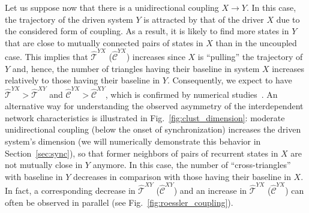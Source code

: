 		Let us suppose now that there is a unidirectional coupling $X\to Y$. In this case, the trajectory of the driven system $Y$ is attracted by that of the driver $X$ due to the considered form of coupling. As a result, it is likely to find more states in $Y$ that are close to mutually connected pairs of states in $X$ than in the uncoupled case. This implies that $\hat{\mathcal{T}}^{YX}$ ($\hat{\mathcal{C}}^{YX}$) increases since $X$ is ``pulling'' the trajectory of $Y$ and, hence, the number of triangles having their baseline in system $X$ increases relatively to those having their baseline in $Y$. Consequently, we expect to have $\hat{\mathcal{T}}^{YX}>\hat{\mathcal{T}}^{XY}$ and $\hat{\mathcal{C}}^{YX}>\hat{\mathcal{C}}^{XY}$, which is confirmed by numerical studies~\cite{Feldhoff2012}. An alternative way for understanding the observed asymmetry of the interdependent network characteristics is illustrated in Fig.~\ref{fig:clust_dimension}: moderate unidirectional coupling (below the onset of synchronization) increases the driven system's dimension \cite{Romano2007,zou2011} (we will numerically demonstrate this behavior in Section~\ref{sec:sync}), so that former neighbors of pairs of recurrent states in $X$ are not mutually close in $Y$ anymore. In this case, the number of ``cross-triangles'' with baseline in $Y$ decreases in comparison with those having their baseline in $X$. In fact, a corresponding decrease in $\hat{\mathcal{T}}^{XY}$ ($\hat{\mathcal{C}}^{XY}$) and an increase in $\hat{\mathcal{T}}^{YX}$ ($\hat{\mathcal{C}}^{YX}$) can often be observed in parallel (see Fig.~\ref{fig:roessler_coupling}).%

